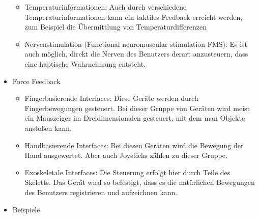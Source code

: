 \documentclass[paper=a4, fontsize=11pt]{scrartcl} %
\numberwithin{equation}{section} %
\numberwithin{figure}{section} %
\numberwithin{table}{section} %
\begin{document}
\begin{itemize}
\begin{itemize}
\item Temperaturinformationen: Auch durch verschiedene Temperaturinformationen kann ein taktiles Feedback erreicht werden, zum Beispiel die Übermittlung von Temperaturdifferenzen
\item Nervenstimulation (Functional neuromuscular stimulation FMS): Es ist auch möglich, direkt die Nerven des Benutzers derart anzusteuern, dass eine haptische Wahrnehmung entsteht.
\end{itemize}
\item Force Feedback
\begin{itemize}
\item Fingerbasierende Interfaces: Diese Geräte werden durch Fingerbewegungen gesteuert. Bei dieser Gruppe von Geräten wird meist ein Mauszeiger im Dreidimensionalen gesteuert, mit dem man Objekte anstoßen kann.
\item Handbasierende Interfaces: Bei diesen Geräten wird die Bewegung der Hand ausgewertet. Aber auch Joysticks zählen zu dieser Gruppe.
\item Exoskeletale Interfaces: Die Steuerung erfolgt hier durch Teile des Skeletts. Das Gerät wird so befestigt, dass es die natürlichen Bewegungen des Benutzers registrieren und aufzeichnen kann.
\end{itemize}
\item Beispiele
\end{itemize}
\end{document}
